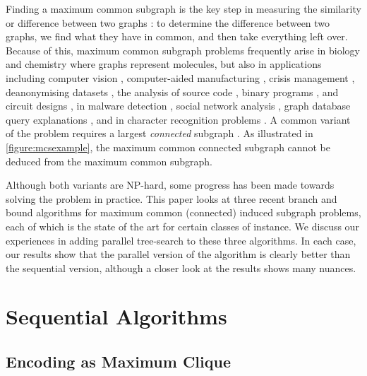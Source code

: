 \documentclass[sigconf]{acmart}
\begin{document}
Finding a maximum common subgraph is the key step in measuring the similarity or difference between
two graphs \citep{DBLP:journals/prl/Bunke97,DBLP:journals/prl/FernandezV01,o:Kriege15}: to determine
the difference between two graphs, we find what they have in common, and then take everything left
over. Because of this, maximum common subgraph problems frequently arise in biology and chemistry
\citep{DBLP:journals/jcamd/RaymondW02a,o:EhrlichR11,DBLP:journals/dam/GayFMSS14} where graphs
represent molecules, but also in applications including computer vision
\citep{DBLP:journals/jair/CookH94,DBLP:conf/gbrpr/CombierDS13}, computer-aided manufacturing
\citep{o:LuoWSN17}, crisis management \citep{o:DelavalladeFLL16}, deanonymising datasets
\citep{o:SharadD13}, the analysis of source code \citep{DBLP:journals/tkde/DjokoCH97}, binary
programs \citep{DBLP:conf/icics/GaoRS08}, and circuit designs \citep{DBLP:journals/jair/CookH94}, in
malware detection \citep{DBLP:journals/compsec/ParkRS13}, social network analysis
\citep{DBLP:journals/tkde/FangYZZ15}, graph database query explanations
\citep{DBLP:journals/jcss/VasilyevaTBL16}, and in character recognition problems
\citep{DBLP:journals/pr/LuRS91}.  A common variant of the problem requires a largest
\emph{connected} subgraph
\citep{DBLP:journals/tcs/Koch01,DBLP:journals/jcamd/RaymondW02a,DBLP:conf/mco/VismaraV08,o:EhrlichR11,o:LuoWSN17}.
As illustrated in \cref{figure:mcsexample}, the maximum common connected subgraph cannot be deduced
from the maximum common subgraph.

Although both variants are NP-hard, some progress has been made towards solving the problem in
practice.  This paper looks at three recent branch and bound algorithms for maximum common
(connected) induced subgraph problems, each of which is the state of the art for certain classes of
instance. We discuss our experiences in adding parallel tree-search to these three algorithms. In
each case, our results show that the parallel version of the algorithm is clearly better than the
sequential version, although a closer look at the results shows many nuances.

\section{Sequential Algorithms}

\subsection{Encoding as Maximum Clique}
\end{document}
